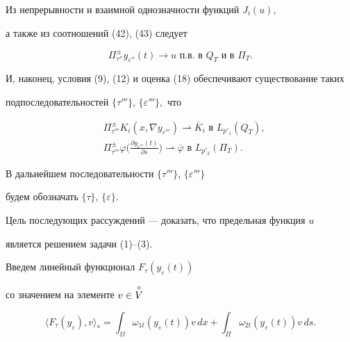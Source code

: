 Из непрерывности и взаимной однозначности функций $J_i(u)$, 


а также из соотношений (42), (43) следует 


\begin{equation} 


\Pi^{\pm}_{\tau ''}y_{\varepsilon ''}(t) \to u \text{ п.в. в } Q_T \text


{ и в }\Pi_T. 


\end{equation} 


И, наконец, условия (9), (12) и оценка (18) обеспечивают существование таких 


подпоследовательностей $\{\tau'''\}$, $\{\varepsilon'''\},$ что 


\begin{align} 


&\Pi^{\pm}_{\tau '''}K_i(x,\nabla y_{\varepsilon '''}) \rightharpoonup  


\overline K_i \text { в } L_{p'_1}(Q_T),\\ 


&\Pi^{\pm}_{\tau '''}\varphi\bigl(\frac{\partial y_{\varepsilon '''}(t)} 


{\partial s}\bigr) \rightharpoonup \overline \varphi \text { в }  


L_{p'_2}(\Pi_T). 


\end{align} 


В дальнейшем последовательности $\{\tau'''\}$, $\{\varepsilon'''\}$ 


будем обозначать $\{\tau\}$, $\{\varepsilon\}$. 


 


Цель последующих рассуждений --- доказать, что предельная функция $u$ 


является решением задачи (1)--(3). 


 


Введем линейный функционал $F_\tau (y_\varepsilon(t))$ 


со значением на элементе $v\in \overset{\circ} V$ 


\begin{equation*} 


\langle F_\tau(y_\varepsilon), v\rangle_* = \int_\Omega 


\omega_{1t}(y_\varepsilon(t))v\,dx + \int_\Pi 


\omega_{2t}(y_\varepsilon(t))v\,ds. 


\end{equation*} 


